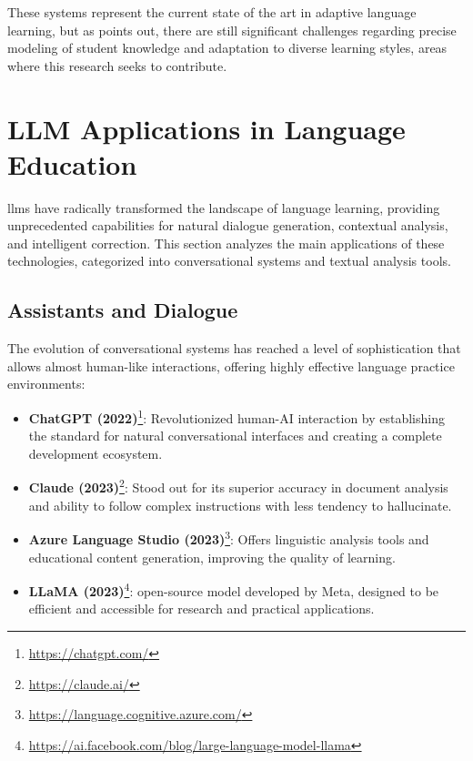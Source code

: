 These systems represent the current state of the art in adaptive language learning, but as \cite{vanlehn2011relative} points out, there are still significant challenges regarding precise modeling of student knowledge and adaptation to diverse learning styles, areas where this research seeks to contribute.

\section{LLM Applications in Language Education}
\label{sec:llm-applications}

\gls{llm}s have radically transformed the landscape of language learning, providing unprecedented capabilities for natural dialogue generation, contextual analysis, and intelligent correction. This section analyzes the main applications of these technologies, categorized into conversational systems and textual analysis tools.


\subsection{Assistants and Dialogue}
\label{subsec:assistants-dialogue}

The evolution of conversational systems has reached a level of sophistication that allows almost human-like interactions, offering highly effective language practice environments:


\begin{itemize}
  \item \textbf{ChatGPT (2022)}\footnote{\url{https://chatgpt.com/}}: Revolutionized human-AI interaction by establishing the standard for natural conversational interfaces and creating a complete development ecosystem.
  \item \textbf{Claude (2023)}\footnote{\url{https://claude.ai/}}: Stood out for its superior accuracy in document analysis and ability to follow complex instructions with less tendency to hallucinate.
  \item \textbf{Azure Language Studio (2023)}\footnote{\url{https://language.cognitive.azure.com/}}: Offers linguistic analysis tools and educational content generation, improving the quality of learning.
  \item \textbf{LLaMA (2023)}\footnote{\url{https://ai.facebook.com/blog/large-language-model-llama}}: \gls{open-source} model developed by Meta, designed to be efficient and accessible for research and practical applications.
\end{itemize}

